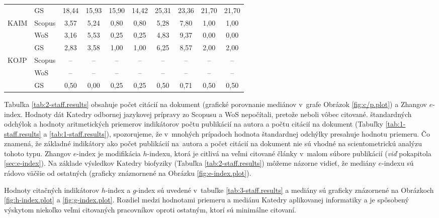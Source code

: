 \begin{table}
\begin{tabularx}{\textwidth}{XXcccc@{\hspace{3ex}}cccc}
         & GS     & 18,44 & 15,93 & 15,90 & 14,42 & 25,31 & 23,36 & 21,70 & 21,70 \\[3ex]
    KAIM & Scopus & 3,57  & 5,24  & 0,80  & 0,80  & 5,28  & 7,80  & 1,00  & 1,00  \\
         & WoS    & 3,16  & 5,53  & 0,25  & 0,25  & 4,83  & 9,37  & 0,00  & 0,00  \\
         & GS     & 2,83  & 3,58  & 1,00  & 1,00  & 6,25  & 8,57  & 2,00  & 2,00  \\[3ex]
    KOJP & Scopus & --    & --    & --    & --    & --    & --    & --    & --    \\
         & WoS    & --    & --    & --    & --    & --    & --    & --    & --    \\
         & GS     & 0,50  & 0,00  & 0,25  & 0,25  & 0,50  & 0,71  & 0,50  & 0,50  \\[0.5ex]
    \bottomrule
  \end{tabularx}
\end{table}

Tabuľka \ref{tab:2-staff.results} obsahuje počet citácií na dokument (grafické
porovnanie mediánov v~grafe Obrázok \ref{fig:c/p.plot}) a Zhangov $e$-index.
Hodnoty dát Katedry odbornej jazykovej prípravy zo Scopusu a WoS nepočítali,
pretože neboli vôbec citované.  štandardných odchýlok a hodnoty aritmetických
priemerov indikátorov počtu publikácií na autora a počtu citácií na dokument
(Tabuľky \ref{tab:1-staff.results} a \ref{tab:1-staff.results}), spozorujeme, že
v~mnohých prípadoch hodnota štandardnej odchýlky presahuje hodnotu priemeru.  Čo
znamená, že základné indikátory ako počet publikácií na~autora a počet citácií
na dokument nie sú vhodné na scientometrickú analýzu tohoto typu.  Zhangov
$e$-index je modifikácia $h$-indexu, ktorá je citlivá na veľmi citované články
v~malom súbore publikácií (\emph{viď} pokapitola \ref{sec:e-index}).  Na základe
výsledkov Katedry biofyziky (Tabuľka \ref{tab:2-staff.results}) môžeme názorne
vidieť, že mediány $e$-indexu sú rádovo väčšie od ostatných (graficky
znáznornené na Obrázku \ref{fig:e-index.plot}).

Hodnoty citačných indikátorov $h$-index a $g$-index sú uvedené v~tabuľke
\ref{tab:3-staff.results} a mediány sú graficky znázornené na Obrázkoch
\ref{fig:h-index.plot} a \ref{fig:g-index.plot}.  Rozdiel medzi hodnotami
priemeru a mediánu Katedry aplikovanej informatiky a je spôsobený výskytom
niekoľko veľmi citovaných pracovníkov oproti ostatným, ktorí sú minimálne
citovaní.

